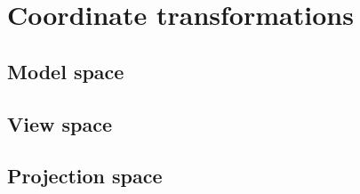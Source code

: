\section{Coordinate transformations}
\label{sec:opengl_coordinate_transformations}
\subsection{Model space}
\subsection{View space}
\subsection{Projection space}